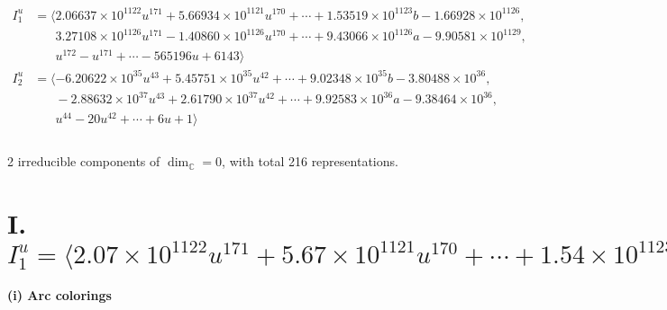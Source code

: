 \documentclass[1p]{elsarticle_modified}
\theoremstyle{definition}
\begin{document}
\begin{align*}
I^u_{1}&=\langle 
2.06637\times10^{1122} u^{171}+5.66934\times10^{1121} u^{170}+\cdots+1.53519\times10^{1123} b-1.66928\times10^{1126},\\
\phantom{I^u_{1}}&\phantom{= \langle  }3.27108\times10^{1126} u^{171}-1.40860\times10^{1126} u^{170}+\cdots+9.43066\times10^{1126} a-9.90581\times10^{1129},\\
\phantom{I^u_{1}}&\phantom{= \langle  }u^{172}- u^{171}+\cdots-565196 u+6143\rangle \\
I^u_{2}&=\langle 
-6.20622\times10^{35} u^{43}+5.45751\times10^{35} u^{42}+\cdots+9.02348\times10^{35} b-3.80488\times10^{36},\\
\phantom{I^u_{2}}&\phantom{= \langle  }-2.88632\times10^{37} u^{43}+2.61790\times10^{37} u^{42}+\cdots+9.92583\times10^{36} a-9.38464\times10^{36},\\
\phantom{I^u_{2}}&\phantom{= \langle  }u^{44}-20 u^{42}+\cdots+6 u+1\rangle \\
\\
\end{align*}
\raggedright * 2 irreducible components of $\dim_{\mathbb{C}}=0$, with total 216 representations.\\
\newpage
\renewcommand{\arraystretch}{1}
\centering \section*{I. $I^u_{1}= \langle 2.07\times10^{1122} u^{171}+5.67\times10^{1121} u^{170}+\cdots+1.54\times10^{1123} b-1.67\times10^{1126},\;3.27\times10^{1126} u^{171}-1.41\times10^{1126} u^{170}+\cdots+9.43\times10^{1126} a-9.91\times10^{1129},\;u^{172}- u^{171}+\cdots-565196 u+6143 \rangle$}
\flushleft \textbf{(i) Arc colorings}\\
\end{document}
